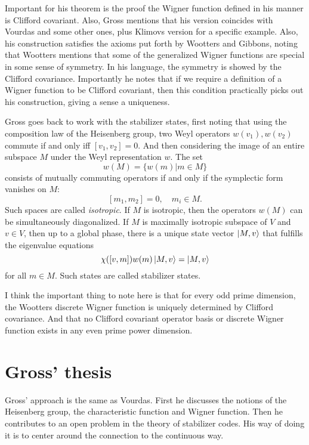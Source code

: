 \documentclass[a4paper]{article}
\begin{document}
  Important for his theorem is the proof the Wigner function
  defined in his manner is Clifford covariant. Also, Gross
  mentions that his version coincides with Vourdas and some
  other ones, plus Klimovs version for a specific example.
  Also, his construction satisfies the axioms put forth by
  Wootters and Gibbons, noting that Wootters mentions that
  some of the generalized Wigner functions are special in
  some sense of symmetry. In his language, the symmetry is
  showed by the Clifford covariance. Importantly he notes
  that if we require a definition of a Wigner function to be
  Clifford covariant, then this condition practically picks
  out his construction, giving a sense a uniqueness.

  Gross goes back to work with the stabilizer states, first
  noting that using the composition law of the Heisenberg
  group, two Weyl operators $w(v_1),w(v_2)$ commute if and
  only iff $[v_1,v_2] = 0$. And then considering the image
  of an entire subspace $M$ under the Weyl representation
  $w$. The set
  \[
    w(M) = \{w(m) | m \in M\}
  \] 
  consists of mutually commuting operators if and only if
  the symplectic form vanishes on $M$:
  \[
    [m_1,m_2] = 0,
    \quad m_i \in M.
  \] 
  Such spaces are called \textit{isotropic}. If $M$ is
  isotropic, then the operators $w(M)$ can be simultaneously
  diagonalized. If $M$ is maximally isotropic subspace of
  $V$ and $v \in V$, then up to a global phase, there is a
  unique state vector $\ket{M,v}$ that fulfills the
  eigenvalue equations
  \[
    \chi([v,m])w(m)\ket{M,v} = \ket{M,v}
  \] 
  for all $m \in M$. Such states are called stabilizer
  states.

  I think the important thing to note here is that for every
  odd prime dimension, the Wootters discrete Wigner function
  is uniquely determined by Clifford covariance. And that no
  Clifford covariant operator basis or discrete Wigner
  function exists in any even prime power dimension.

  \section{Gross' thesis}

  Gross' approach is the same as Vourdas. First he discusses
  the notions of the Heisenberg group, the characteristic
  function and Wigner function. Then he contributes to an
  open problem in the theory of stabilizer codes. His way of
  doing it is to center around the connection to the
  continuous way.
\end{document}
